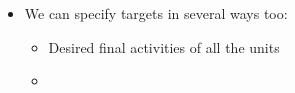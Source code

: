 \begin{itemize}
\begin{itemize}
		\item We can specify targets in several ways too:
		\begin{itemize}
			\item Desired final activities of all the units
			\item 
		\end{itemize}
	\end{itemize}
\end{itemize}